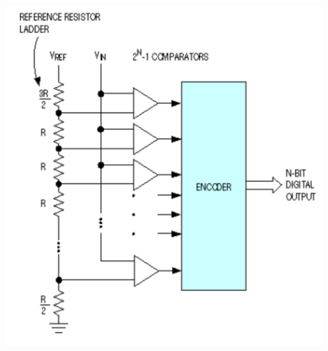 \documentclass{beamer}
\begin{document}
\begin{frame}
\begin{columns}
\begin{column}{0.35\textwidth}
      \includegraphics[height=0.45\textheight,width=0.9\textwidth]{d3/adc_flash}
    \end{column}
  \end{columns}
\end{frame}

\end{document}
